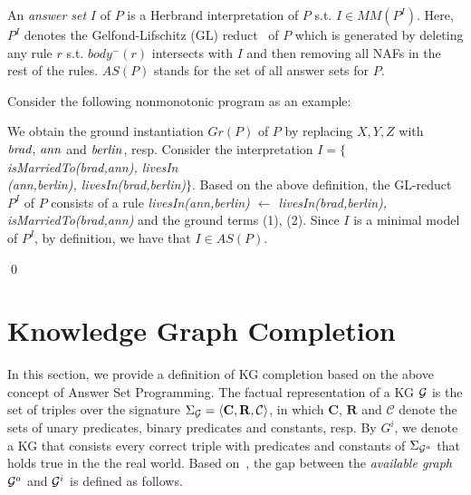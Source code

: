 An \textit{answer set} $I$ of $P$ is a Herbrand interpretation of $P$ s.t. $I \in MM(P^I)$. Here, $P^I$ denotes the Gelfond-Lifschitz (GL) reduct~\cite{ref50} of $P$ which is generated by deleting any rule $r$ s.t. $body^-(r)$ intersects with $I$ and then removing all NAFs in the rest of the rules. $AS(P)$ stands for the set of all answer sets for $P$.

\begin{example}\label{ex:as}
Consider the following nonmonotonic program as an example:\\
{\small {}}
            
\normalsize
{\smallskip

\noindent            
We obtain the ground instantiation $Gr(P)$ of $P$ by replacing $X,Y,Z$ with $\mathit{brad, \,ann}$ and $\mathit{berlin}$, resp. Consider the interpretation $I=\{${\small\textit{isMarriedTo(brad,ann), livesIn\\(ann,berlin), livesIn(brad,berlin)}}$\}$. Based on the above definition, the GL-reduct $P^I$ of $P$ consists of a rule \textit{livesIn(ann,berlin) $\leftarrow$ livesIn(brad,berlin), isMarriedTo(brad,ann)} and the ground terms (1), (2). Since $I$ is a minimal model of $P^I$, by definition, we have that $I \in AS(P)$.}\qed
\end{example}

\section{Knowledge Graph Completion}

In this section, we provide a definition of KG completion based on the above concept of Answer Set Programming. The factual representation of a KG $\mathcal{G}$ is the set of triples over the signature $\Sigma_{\mathcal{G}}=\langle\mathbf{C},\mathbf{R},\mathcal{C}\rangle$, in which $\mathbf{C}$, $\mathbf{R}$ and $\mathcal{C}$ denote the sets of unary predicates, binary predicates and constants, resp. By $G^i$, we denote a KG that consists every correct triple with predicates and constants of $\Sigma_{\mathcal{G}^a}$ that holds true in the the real world. Based on~\cite{ref51}, the gap between the \emph{available graph} $\mathcal{G}^a$ and $\mathcal{G}^i$ is defined as follows.

